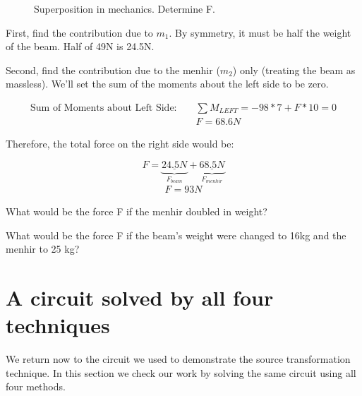 \begin{figure}[H]
\begin{center}
\caption{Superposition in mechanics. Determine F.}
\end{center}
\end{figure}

First, find the contribution due to $m_1$. By symmetry, it must be half the weight of the beam. Half of 49N is 24.5N.

Second, find the contribution due to the menhir ($m_2$) only (treating the beam as massless). We'll set the sum of the moments about the left side to be zero.
\par
\begin{align*}
\text{Sum of Moments about Left Side: }&&\sum{M_{LEFT}}=-98*7+F*10=0\\
&&F=68.6N
\end{align*}

Therefore, the total force on the right side would be:

\[
F=\underbrace{\underline{24.5N}}_{F_{beam}}+\underbrace{\underline{68.5N}}_{F_{menhir}}
\]
\begin{align*}
F=93N
\end{align*}

\begin{blevel}
What would be the force F if the menhir doubled in weight?
\end{blevel}

\begin{clevel}
What would be the force F if the beam's weight were changed to 16kg and the menhir to 25 kg?
\end{clevel}


\section{A circuit solved by all four techniques}
We return now to the circuit we used to demonstrate the source transformation technique. In this section we check our work by solving the same circuit using all four methods.

